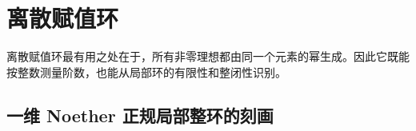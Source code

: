 
\section{离散赋值环}
\label{b3:sec:1002}

离散赋值环最有用之处在于，所有非零理想都由同一个元素的幂生成。因此它既能按整数测量阶数，也能从局部环的有限性和整闭性识别。


\subsection{一维 Noether 正规局部整环的刻画}
\label{b3:subsec:1002:01}

